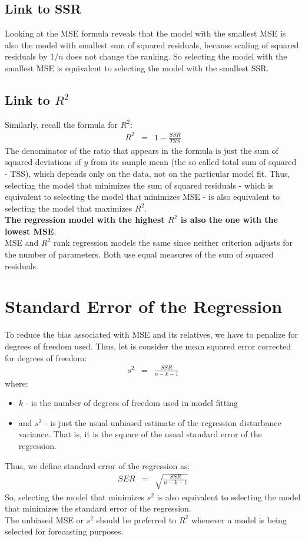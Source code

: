 \subsection{Link to SSR}

Looking at the MSE formula reveals that the model with the smallest MSE is also the model with smallest sum of squared residuals, because scaling of squared residuals by $1/n$ does not change the ranking. So selecting the model with the smallest MSE is equivalent to selecting the model with the smallest SSR.

\subsection{Link to \texorpdfstring{$R^{2}$}{R2}}

Similarly, recall the formula for $R^{2}$:
\begin{eqnarray}
	R^{2} &=& 1 - \frac{SSR}{TSS}
\end{eqnarray}
The denominator of the ratio that appears in the formula is just the sum of squared deviations of $y$ from its sample mean (the so called total sum of squared - TSS), which depends only on the data, not on the particular model fit. Thus, selecting the model that minimizes the sum of squared residuals  - which is equivalent to selecting the model that minimizes MSE - is also equivalent to selecting the model that maximizes $R^{2}$.\\
\textbf{\color{blue}The regression model with the highest $R^{2}$ is also the one with the lowest MSE}.\\
MSE and $R^{2}$ rank regression models the same since neither criterion adjusts for the number of parameters. Both use equal measures of the sum of squared residuals.

\section{Standard Error of the Regression}
To reduce the bias associated with MSE and its relatives, we have to penalize for degrees of freedom used. Thus, let is consider the mean squared error corrected for degrees of freedom:
\begin{eqnarray}
s^{2} &=& \frac{SSR}{n - k - 1}
\end{eqnarray}
where:
\begin{itemize}
	\item $k$ - is the number of degrees of freedom used in model fitting
	\item and $s^{2}$ - is just the usual unbiased estimate of the regression disturbance variance. That is, it is the square of the usual standard error of the regression.
\end{itemize}
Thus, we define standard error of the regression as:
\begin{eqnarray}
SER &=& \sqrt{\frac{SSR}{n - k - 1}}
\end{eqnarray}
So, selecting the model that minimizes $s^{2}$ is also equivalent to selecting the model that minimizes the standard error of the regression.\\
The unbiased MSE or $s^{2}$ should be preferred to $R^{2}$ whenever a model is being selected for forecasting purposes.

